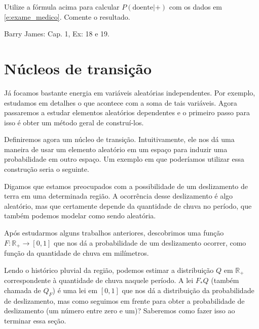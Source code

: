 \begin{exercise}
  Utilize a fórmula acima para calcular $P(\text{doente} | +)$ com os dados em \eqref{e:exame_medico}.
  Comente o resultado.
\end{exercise}

\begin{exercise}
  Barry James: Cap. 1, Ex: 18 e 19.
\end{exercise}



\section{Núcleos de transição}

Já focamos bastante energia em variáveis aleatórias independentes.
Por exemplo, estudamos em detalhes o que acontece com a soma de tais variáveis.
Agora passaremos a estudar elementos aleatórios dependentes e o primeiro passo para isso é obter um método geral de construí-los.

Definiremos agora um núcleo de transição.
Intuitivamente, ele nos dá uma maneira de usar um elemento aleatório em um espaço para induzir uma probabilidade em outro espaço.
Um exemplo em que poderíamos utilizar essa construção seria o seguinte.

Digamos que estamos preocupados com a possibilidade de um deslizamento de terra em uma determinada região.
A ocorrência desse deslizamento é algo aleatório, mas que certamente depende da quantidade de chuva no período, que também podemos modelar como sendo aleatória.

Após estudarmos alguns trabalhos anteriores, descobrimos uma função $F:\mathbb{R}_+ \to [0,1]$ que nos dá a probabilidade de um deslizamento ocorrer, como função da quantidade de chuva em milímetros.

Lendo o histórico pluvial da região, podemos estimar a distribuição $Q$ em $\mathbb{R}_+$ correspondente à quantidade de chuva naquele período.
A lei $F_* Q$ (também chamada de $Q_F$) é uma lei em $[0,1]$ que nos dá a distribuição da probabilidade de deslizamento, mas como seguimos em frente para obter a probabilidade de deslizamento (um número entre zero e um)?
Saberemos como fazer isso ao terminar essa seção.

